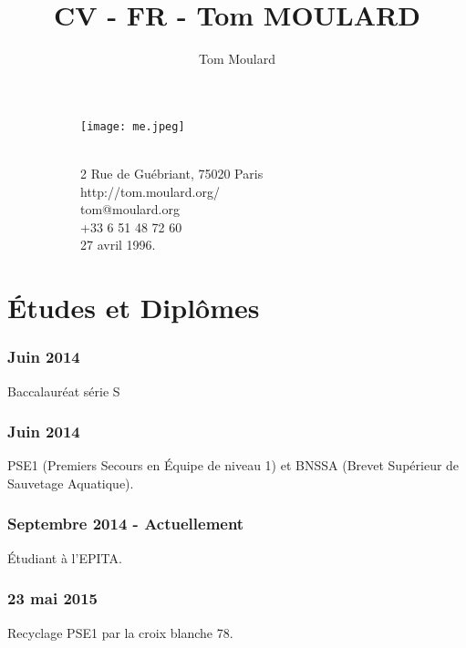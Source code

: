 \documentclass{article}
\begin{document}
    \title{CV - FR - Tom MOULARD}

    \author{Tom Moulard}

    \begin{center}
        \begin{figure}
            \centering
            \begin{subfigure}[b]{0.3\textwidth}
                \texttt{[image: me.jpeg]}
            \end{subfigure}
            \begin{subfigure}[b]{0.3\textwidth}
                {\huge\bfseries\theauthor}\\
                \vspace{.25em}
                2 Rue de Gu\'ebriant, 75020 Paris\\
                http://tom.moulard.org/\\
                tom@moulard.org\\
                +33 6 51 48 72 60\\
                27 avril 1996.
            \end{subfigure}
        \end{figure}
    \end{center}

    \hspace{-.25em}
    \section{\'Etudes et Dipl\^omes}
        \subsubsection{Juin 2014}
            Baccalaur\'eat s\'erie S
        \subsubsection{Juin 2014}
            PSE1 (Premiers Secours en \'Equipe de niveau 1) et BNSSA (Brevet Sup\'erieur de Sauvetage Aquatique).
        \subsubsection{Septembre 2014 - Actuellement}
            \'Etudiant \`a l'EPITA.
        \subsubsection{23 mai 2015}
            Recyclage PSE1 par la croix blanche 78.
\end{document}
